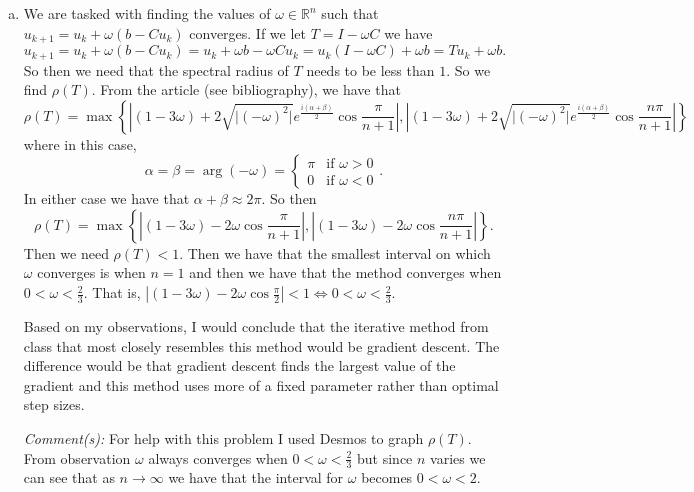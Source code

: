 \documentclass{article}
\begin{document}
\begin{enumerate}[(a)]
    \item We are tasked with finding the values of $\omega \in \mathbb{R}^n$ such that $u_{k+1} = u_k + \omega(b - Cu_k)$ converges. If we let $T = I - \omega C$ we have 
    $$ u_{k+1} = u_k + \omega (b - Cu_k) = u_k + \omega b - \omega Cu_k = u_k(I - \omega C) + \omega b = Tu_k + \omega b.$$ 
    So then we need that the spectral radius of $T$ needs to be less than $1$. So we find $\rho(T)$. From the article (see bibliography), we have that $$ \rho(T) = \max \left\{ \left\vert (1 - 3\omega) + 2\sqrt{\vert (- \omega)^2 \vert} e^{\frac{i(\alpha + \beta)}{2}} \cos \frac{\pi}{n + 1}\right\vert, \left\vert (1 - 3\omega) + 2\sqrt{\vert (- \omega)^2 \vert} e^{\frac{i(\alpha + \beta)}{2}} \cos \frac{n \pi}{n + 1}\right\vert\right\}$$ where  in this case, 
    $$\alpha = \beta = \arg(-\omega) = \left\{\begin{matrix} 
        \pi & \text{if } \omega > 0 \\ 
        0 & \text{if } \omega < 0 
        \end{matrix}\right. .$$
    In either case we have that $\alpha + \beta \approx 2\pi$. So then $$\rho(T) = \max \left\{ \left\vert (1 - 3\omega) - 2 \omega \cos \frac{\pi}{n + 1}\right\vert, \left\vert (1 - 3\omega) - 2 \omega \cos \frac{n \pi}{n + 1}\right\vert\right\} .$$
    Then we need $\rho(T) < 1$. Then we have that the smallest interval on which $\omega$ converges is when $n = 1$ and then we have that the method converges when $0 < \omega < \frac{2}{3}$. That is, $\left\vert (1 - 3\omega) - 2 \omega \cos \frac{\pi}{2}\right\vert < 1 \iff 0 < \omega < \frac{2}{3}$.

    Based on my observations, I would conclude that the iterative method from class that most closely resembles this method would be gradient descent. The difference would be that gradient descent finds the largest value of the gradient and this method uses more of a fixed parameter rather than optimal step sizes.

    \textit{Comment(s):}
    For help with this problem I used Desmos to graph $\rho(T)$. From observation $\omega$ always converges when $0 < \omega < \frac{2}{3}$ but since $n$ varies we can see that as $n \to \infty$ we have that the interval for $\omega$ becomes $0 < \omega < 2$.
\end{enumerate}
\end{document}
